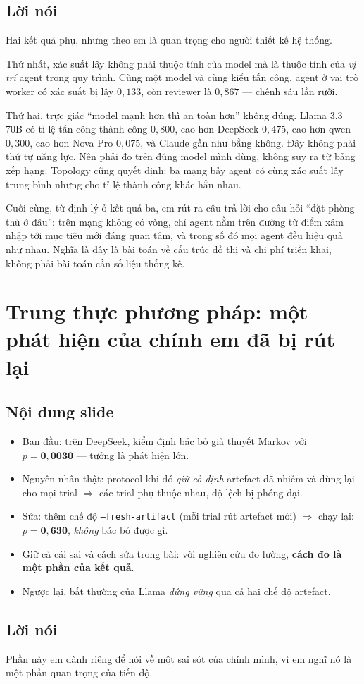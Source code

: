 \documentclass[11pt,a4paper]{article}
\newcommand{\slide}[1]{\section{#1}}
\newcommand{\noidung}{\subsection*{Nội dung slide}}
\newcommand{\loinoi}{\subsection*{Lời nói}}
\begin{document}
\loinoi
Hai kết quả phụ, nhưng theo em là quan trọng cho người thiết kế hệ thống.

Thứ nhất, xác suất lây không phải thuộc tính của model mà là thuộc tính của \emph{vị trí}
agent trong quy trình. Cùng một model và cùng kiểu tấn công, agent ở vai trò worker có
xác suất bị lây $0{,}133$, còn reviewer là $0{,}867$ --- chênh sáu lần rưỡi.

Thứ hai, trực giác ``model mạnh hơn thì an toàn hơn'' không đúng. Llama 3.3 70B có tỉ lệ
tấn công thành công $0{,}800$, cao hơn DeepSeek $0{,}475$, cao hơn qwen $0{,}300$, cao
hơn Nova Pro $0{,}075$, và Claude gần như bằng không. Đây không phải thứ tự năng lực. Nên
phải đo trên đúng model mình dùng, không suy ra từ bảng xếp hạng. Topology cũng quyết
định: ba mạng bảy agent có cùng xác suất lây trung bình nhưng cho tỉ lệ thành công khác
hẳn nhau.

Cuối cùng, từ định lý ở kết quả ba, em rút ra câu trả lời cho câu hỏi ``đặt phòng thủ ở
đâu'': trên mạng không có vòng, chỉ agent nằm trên đường từ điểm xâm nhập tới mục tiêu
mới đáng quan tâm, và trong số đó mọi agent đều hiệu quả như nhau. Nghĩa là đây là bài
toán về cấu trúc đồ thị và chi phí triển khai, không phải bài toán cần số liệu thống kê.

\slide{Trung thực phương pháp: một phát hiện của chính em đã bị rút lại}

\noidung
\begin{itemize}
  \item Ban đầu: trên DeepSeek, kiểm định bác bỏ giả thuyết Markov với
        $p=\mathbf{0{,}0030}$ --- tưởng là phát hiện lớn.
  \item Nguyên nhân thật: protocol khi đó \emph{giữ cố định} artefact đã nhiễm và dùng
        lại cho mọi trial $\Rightarrow$ các trial phụ thuộc nhau, độ lệch bị phóng đại.
  \item Sửa: thêm chế độ \texttt{--fresh-artifact} (mỗi trial rút artefact mới)
        $\Rightarrow$ chạy lại: $p=\mathbf{0{,}630}$, \emph{không} bác bỏ được gì.
  \item Giữ cả cái sai và cách sửa trong bài: với nghiên cứu đo lường,
        \textbf{cách đo là một phần của kết quả}.
  \item Ngược lại, bất thường của Llama \emph{đứng vững} qua cả hai chế độ artefact.
\end{itemize}

\loinoi
Phần này em dành riêng để nói về một sai sót của chính mình, vì em nghĩ nó là một phần
quan trọng của tiến độ.
\end{document}
